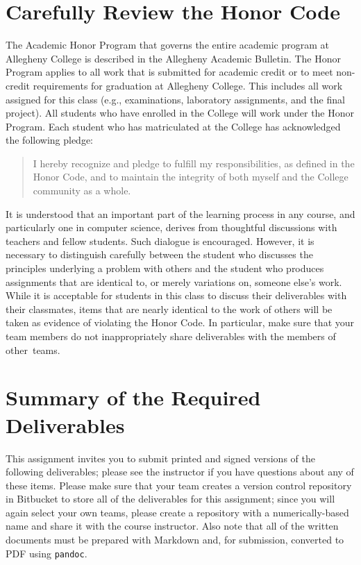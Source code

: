 \section*{Carefully Review the Honor Code}

The Academic Honor Program that governs the entire academic program at Allegheny College is described in the Allegheny
Academic Bulletin.  The Honor Program applies to all work that is submitted for academic credit or to meet non-credit
requirements for graduation at Allegheny College.  This includes all work assigned for this class (e.g., examinations,
  laboratory assignments, and the final project).  All students who have enrolled in the College will work under the Honor
Program.  Each student who has matriculated at the College has acknowledged the following pledge:

\vspace*{-.05in}
\begin{quote}
  I hereby recognize and pledge to fulfill my responsibilities, as defined in the Honor Code, and to maintain the
  integrity of both myself and the College community as a whole.
\end{quote}
\vspace*{-.05in}

\noindent It is understood that an important part of the learning process in any course, and particularly one in
computer science, derives from thoughtful discussions with teachers and fellow students.  Such dialogue is encouraged.
However, it is necessary to distinguish carefully between the student who discusses the principles underlying a problem
with others and the student who produces assignments that are identical to, or merely variations on, someone else's
work.  While it is acceptable for students in this class to discuss their deliverables with their classmates, items that
are nearly identical to the work of others will be taken as evidence of violating the Honor Code. In particular, make
sure that your team members do not inappropriately share deliverables with the members of \mbox{other teams}.

\section*{Summary of the Required Deliverables}

This assignment invites you to submit printed and signed versions of the following deliverables; please see the
instructor if you have questions about any of these items. Please make sure that your team creates a version control
repository in Bitbucket to store all of the deliverables for this assignment; since you will again select your own
teams, please create a repository with a numerically-based name and share it with the course instructor. Also note that
all of the written documents must be prepared with Markdown and, for submission, converted to PDF using {\tt pandoc}.

